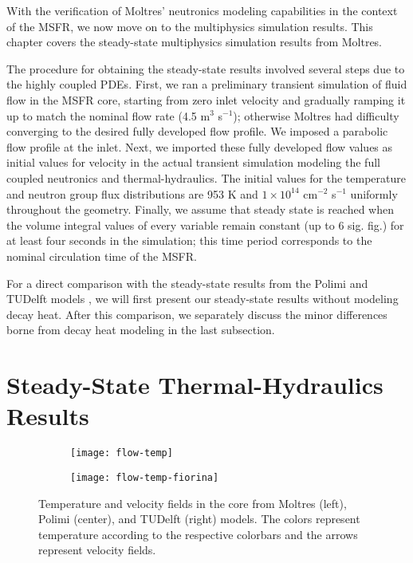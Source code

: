 With the verification of Moltres' neutronics modeling capabilities in the
context of the \gls{MSFR}, we now move on to the multiphysics simulation
results. This chapter covers the steady-state multiphysics simulation results
from Moltres.

The procedure for obtaining the steady-state results involved several steps
due to the highly coupled \glspl{PDE}. First, we ran a preliminary transient
simulation of fluid flow in the \gls{MSFR} core, starting from zero inlet
velocity and gradually ramping it up to match the nominal flow rate (4.5 m$^3$
s$^{-1}$); otherwise Moltres had difficulty converging to the desired fully
developed flow profile. We imposed a parabolic flow profile at the inlet.
Next, we imported these fully developed flow values as initial values for
velocity in the actual transient simulation modeling the full coupled
neutronics and thermal-hydraulics. The initial values for the temperature and
neutron group flux distributions are 953 K and $1 \times 10^{14}$ cm$^{-2}$
s$^{-1}$ uniformly throughout the geometry. Finally, we assume that steady
state is reached when the volume integral values of every variable remain
constant (up to 6 sig. fig.) for at least four seconds in the simulation; this
time period corresponds to the nominal circulation time of the \gls{MSFR}.

For a direct comparison with the steady-state results from the Polimi and
TUDelft models \cite{aufiero_development_2014}, we will first present our
steady-state results without modeling decay heat. After this comparison, we
separately discuss the minor differences borne from decay heat modeling in the
last subsection.

\section{Steady-State Thermal-Hydraulics Results}

\begin{figure}[t!]
    \centering
    \begin{subfigure}[t]{.365\textwidth}
        \centering
        \texttt{[image: flow-temp]}
    \end{subfigure}
    \hfill
    \begin{subfigure}[t]{.625\textwidth}
        \centering
        \texttt{[image: flow-temp-fiorina]}
    \end{subfigure}
    \caption{Temperature and velocity fields in the core from Moltres
    (left), Polimi (center), and TUDelft (right) models. The colors represent
    temperature according to the respective colorbars and the arrows
    represent velocity fields.}
    \label{fig:flow-temp}
\end{figure}

